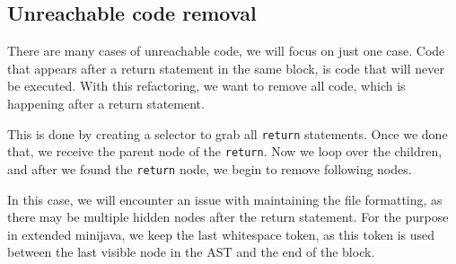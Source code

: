 \subsection{Unreachable code removal}

There are many cases of unreachable code, we will focus on just one case. Code that appears after a return statement in the same block, is code that will never be executed.
With this refactoring, we want to remove all code, which is happening after a return statement.

This is done by creating a selector to grab all \verb|return| statements. Once we done that, we receive the parent node of the \verb|return|. Now we loop over the children, and after we found the \verb|return| node, we begin to remove following nodes.

In this case, we will encounter an issue with maintaining the file formatting, as there may be multiple hidden nodes after the return statement.
For the purpose in extended minijava, we keep the last whitespace token, as this token is used between the last visible node in the AST and the end of the block.